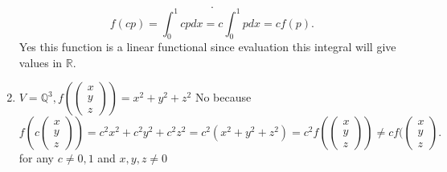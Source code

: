 \documentclass{article}
\begin{document}
\begin{enumerate}
\[            .\] 
            \[
            f(cp) = \int_{0}^{1}cpdx = c\int_{0}^{1}pdx = cf(p)
            .\] 
            Yes this function is a linear functional since evaluation this integral will give values in $ \mathbb{R} $.
        \item $V = \mathbb{Q} ^{3}, f(\left(\begin{array}{c} x \\ y \\ z \end{array}\right) ) = x^2+y^2+z^2$
            No because
            \[
            f(c \left(\begin{array}{c} x \\ y \\ z \end{array}\right) ) = c^2x^2+c^2y^2+c^2z^2 = c^2(x^2+y^2+z^2) = c^2f( \left(\begin{array}{c} x \\ y \\ z \end{array}\right) ) \ne c f( \left(\begin{array}{c} x \\ y \\ z \end{array}\right) 
            .\] 
            for any $c \ne 0, 1$ and  $x,y,z \ne 0$
    \end{enumerate}
\end{document}

